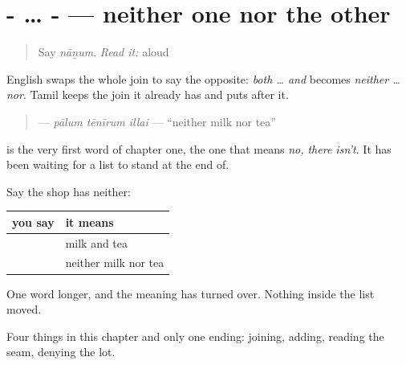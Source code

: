 \section[\texorpdfstring{-\ta{உம்} … -\ta{உம்} \ta{இல்லை} (-um … -um illai)}{-உம் … -உம் இல்லை (-um … -um illai)}]{- … -  — neither one nor the other}

\label{lesson:TA-C74-neither}



\begin{quote}
Say \emph{nāṉum}. \emph{Read it:} \textbf{} aloud
\end{quote}

\begin{grammarlens}[title={Grammar lens: the list stays, the end changes}]
English swaps the whole join to say the opposite: \emph{both … and} becomes \emph{neither … nor}. Tamil keeps the join it already has and puts \textbf{} after it.

\begin{quote}
\textbf{  } — \emph{pālum tēnīrum illai} — \textquotedblleft{}neither milk nor tea\textquotedblright{}
\end{quote}

 is the very first word of chapter one, the one that means \emph{no, there isn't}. It has been waiting for a list to stand at the end of.

Say the shop has neither:

\noindent
\begin{tabularx}{\linewidth}{@{}>{\raggedright\arraybackslash}X>{\raggedright\arraybackslash}X@{}}
\toprule
\textbf{you say} & \textbf{it means} \\
\midrule
\textbf{\ta{பாலும்} \ta{தேநீரும்}} & milk and tea \\
\textbf{\ta{பாலும்} \ta{தேநீரும்} \ta{இல்லை}} & neither milk nor tea \\
\bottomrule
\end{tabularx}

One word longer, and the meaning has turned over. Nothing inside the list moved.
\end{grammarlens}

\begin{grammarlens}[title={What you've built}]
Four things in this chapter and only one ending: joining, adding, reading the seam, denying the lot.
\end{grammarlens}

